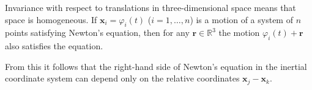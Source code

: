 Invariance with respect to translations in three-dimensional space means that space is homogeneous. If $\mathbf{x}_i = \varphi_i(t)$ ($i = 1, \ldots, n$) is a motion of a system of $n$ points satisfying Newton's equation, then for any $\mathbf{r} \in \mathbb{R}^3$ the motion $\varphi_i(t) + \mathbf{r}$ also satisfies the equation.

From this it follows that the right-hand side of Newton's equation in the inertial coordinate system can depend only on the relative coordinates $\mathbf{x}_j - \mathbf{x}_k$.
